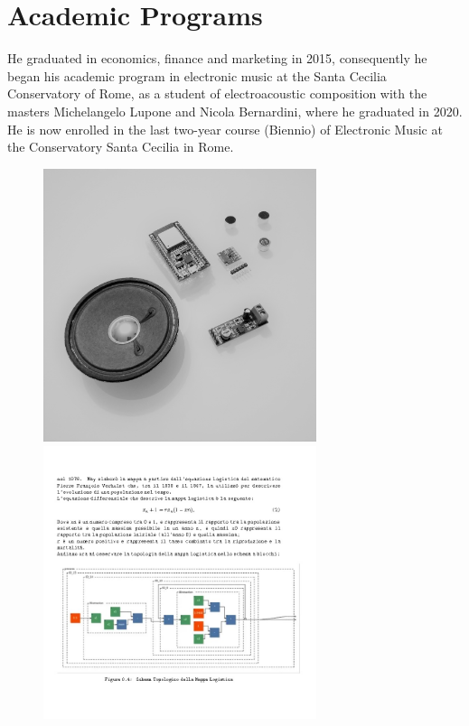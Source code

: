 \documentclass[12pt,landscape]{article}
\begin{document}
{\begin{center}
\begin{figure}[!htb]
\endminipage
\end{figure}

\clearpage


\section*{Academic Programs}

He graduated in economics, finance and marketing in 2015,
\newline
consequently he began his academic program in electronic music
at the Santa Cecilia Conservatory of Rome,
\newline
as a student of electroacoustic composition with the masters
Michelangelo Lupone and Nicola Bernardini, 
where he graduated in 2020.
\newline
He is now enrolled in the last two-year course (Biennio)
of Electronic Music at the Conservatory Santa Cecilia in Rome.

\begin{figure}[!htb]
  \includegraphics[width=8cm]{electroac1.jpg}

\endminipage\hfill
{}
  \includegraphics[width=8cm]{info1.jpg}


\end{figure}
\end{center}}
\end{document}
